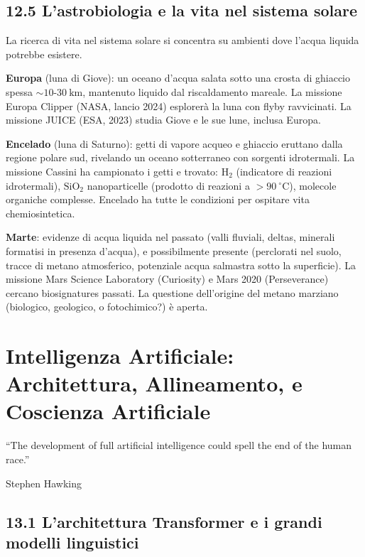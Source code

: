 \documentclass[11.5pt,a4paper,openany]{book}
\theoremstyle{remark}
\begin{document}
\section{12.5 L'astrobiologia e la vita nel sistema solare}

La ricerca di vita nel sistema solare si concentra su ambienti dove l'acqua liquida potrebbe esistere.

\textbf{Europa} (luna di Giove): un oceano d'acqua salata sotto una crosta di ghiaccio spessa $\sim 10$-$30\ \text{km}$, mantenuto liquido dal riscaldamento mareale. La missione Europa Clipper (NASA, lancio 2024) esplorerà la luna con flyby ravvicinati. La missione JUICE (ESA, 2023) studia Giove e le sue lune, inclusa Europa.

\textbf{Encelado} (luna di Saturno): getti di vapore acqueo e ghiaccio eruttano dalla regione polare sud, rivelando un oceano sotterraneo con sorgenti idrotermali. La missione Cassini ha campionato i getti e trovato: H$_2$ (indicatore di reazioni idrotermali), $\text{SiO}_2$ nanoparticelle (prodotto di reazioni a $> 90\ ^\circ\text{C}$), molecole organiche complesse. Encelado ha tutte le condizioni per ospitare vita chemiosintetica.

\textbf{Marte}: evidenze di acqua liquida nel passato (valli fluviali, deltas, minerali formatisi in presenza d'acqua), e possibilmente presente (perclorati nel suolo, tracce di metano atmosferico, potenziale acqua salmastra sotto la superficie). La missione Mars Science Laboratory (Curiosity) e Mars 2020 (Perseverance) cercano biosignatures passati. La questione dell'origine del metano marziano (biologico, geologico, o fotochimico?) è aperta.

\chapter{Intelligenza Artificiale: Architettura, Allineamento, e Coscienza Artificiale}

\epigraph{``The development of full artificial intelligence could spell the end of the human race.''}{Stephen Hawking}

\section{13.1 L'architettura Transformer e i grandi modelli linguistici}
\end{document}
